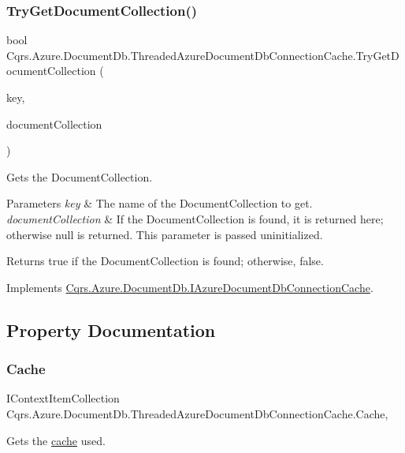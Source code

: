 \subsubsection{\texorpdfstring{Try\+Get\+Document\+Collection()}{TryGetDocumentCollection()}}
{\footnotesize\ttfamily bool Cqrs.\+Azure.\+Document\+Db.\+Threaded\+Azure\+Document\+Db\+Connection\+Cache.\+Try\+Get\+Document\+Collection (\begin{DoxyParamCaption}\item[{string}]{key,  }\item[{out Document\+Collection}]{document\+Collection }\end{DoxyParamCaption})}



Gets the Document\+Collection. 


\begin{DoxyParams}{Parameters}
{\em key} & The name of the Document\+Collection to get.\\
\hline
{\em document\+Collection} & If the Document\+Collection is found, it is returned here; otherwise null is returned. This parameter is passed uninitialized.\\
\hline
\end{DoxyParams}
\begin{DoxyReturn}{Returns}
true if the Document\+Collection is found; otherwise, false.
\end{DoxyReturn}


Implements \hyperlink{interfaceCqrs_1_1Azure_1_1DocumentDb_1_1IAzureDocumentDbConnectionCache_af74bf6c8dc009e0179edc20ef3158f03_af74bf6c8dc009e0179edc20ef3158f03}{Cqrs.\+Azure.\+Document\+Db.\+I\+Azure\+Document\+Db\+Connection\+Cache}.



\subsection{Property Documentation}
\mbox{\label{classCqrs_1_1Azure_1_1DocumentDb_1_1ThreadedAzureDocumentDbConnectionCache_ade4db14c86a07454b713e1fb711692e2_ade4db14c86a07454b713e1fb711692e2}} 
\subsubsection{\texorpdfstring{Cache}{Cache}}
{\footnotesize\ttfamily I\+Context\+Item\+Collection Cqrs.\+Azure.\+Document\+Db.\+Threaded\+Azure\+Document\+Db\+Connection\+Cache.\+Cache\hspace{0.3cm}{\ttfamily [get]}, {\ttfamily [protected]}}



Gets the \hyperlink{}{cache} used. 

